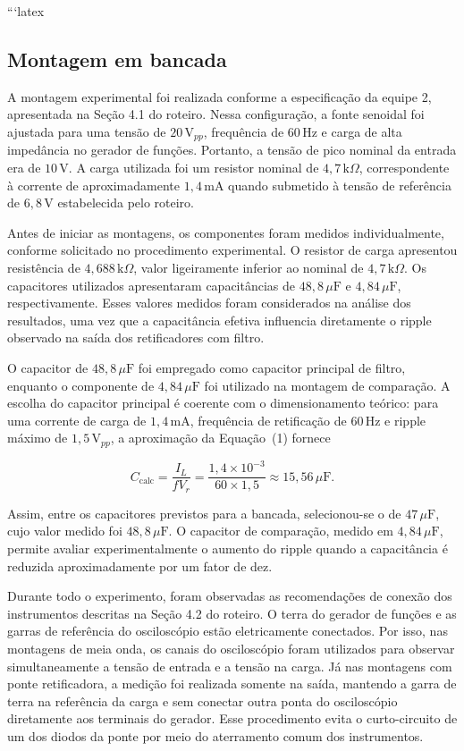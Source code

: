 \documentclass[11pt,a4paper]{article}
\begin{document}
```latex
\subsection{Montagem em bancada}

A montagem experimental foi realizada conforme a especificação da equipe 2, apresentada na Seção 4.1 do roteiro. Nessa configuração, a fonte senoidal foi ajustada para uma tensão de $20\,\text{V}_{pp}$, frequência de $60\,\text{Hz}$ e carga de alta impedância no gerador de funções. Portanto, a tensão de pico nominal da entrada era de $10\,\text{V}$. A carga utilizada foi um resistor nominal de $4{,}7\,\text{k}\Omega$, correspondente à corrente de aproximadamente $1{,}4\,\text{mA}$ quando submetido à tensão de referência de $6{,}8\,\text{V}$ estabelecida pelo roteiro.

Antes de iniciar as montagens, os componentes foram medidos individualmente, conforme solicitado no procedimento experimental. O resistor de carga apresentou resistência de $4{,}688\,\text{k}\Omega$, valor ligeiramente inferior ao nominal de $4{,}7\,\text{k}\Omega$. Os capacitores utilizados apresentaram capacitâncias de $48{,}8\,\mu\text{F}$ e $4{,}84\,\mu\text{F}$, respectivamente. Esses valores medidos foram considerados na análise dos resultados, uma vez que a capacitância efetiva influencia diretamente o ripple observado na saída dos retificadores com filtro.

O capacitor de $48{,}8\,\mu\text{F}$ foi empregado como capacitor principal de filtro, enquanto o componente de $4{,}84\,\mu\text{F}$ foi utilizado na montagem de comparação. A escolha do capacitor principal é coerente com o dimensionamento teórico: para uma corrente de carga de $1{,}4\,\text{mA}$, frequência de retificação de $60\,\text{Hz}$ e ripple máximo de $1{,}5\,\text{V}_{pp}$, a aproximação da Equação~(1) fornece

\[
C_{\mathrm{calc}} =
\frac{I_L}{fV_r}
=
\frac{1{,}4\times10^{-3}}
{60\times1{,}5}
\approx 15{,}56\,\mu\text{F}.
\]

Assim, entre os capacitores previstos para a bancada, selecionou-se o de $47\,\mu\text{F}$, cujo valor medido foi $48{,}8\,\mu\text{F}$. O capacitor de comparação, medido em $4{,}84\,\mu\text{F}$, permite avaliar experimentalmente o aumento do ripple quando a capacitância é reduzida aproximadamente por um fator de dez.

Durante todo o experimento, foram observadas as recomendações de conexão dos instrumentos descritas na Seção 4.2 do roteiro. O terra do gerador de funções e as garras de referência do osciloscópio estão eletricamente conectados. Por isso, nas montagens de meia onda, os canais do osciloscópio foram utilizados para observar simultaneamente a tensão de entrada e a tensão na carga. Já nas montagens com ponte retificadora, a medição foi realizada somente na saída, mantendo a garra de terra na referência da carga e sem conectar outra ponta do osciloscópio diretamente aos terminais do gerador. Esse procedimento evita o curto-circuito de um dos diodos da ponte por meio do aterramento comum dos instrumentos.
\end{document}
